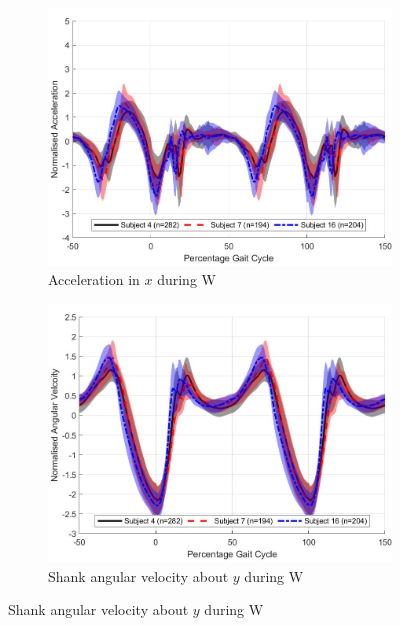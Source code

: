 \documentclass[sensors,article,submit,moreauthors,pdftex]{Definitions/mdpi}
\begin{document}
\begin{figure}[!htb]
     \centering
     \begin{subfigure}[b]{0.49\textwidth}
         \centering
         \includegraphics[width=\textwidth]{Figures/inter_subject_trends/accel_x_trend_Walking.jpg}
         \caption{Acceleration in $x$ during W}
         \label{subfig:x_accel_w}
     \end{subfigure}
     \hfill
     \begin{subfigure}[b]{0.49\textwidth}
         \centering
         \includegraphics[width=\textwidth]{Figures/inter_subject_trends/gyro_y_trend_Walking.jpg}
         \caption{Shank angular velocity about $y$ during W}
         \label{subfig:y_gyro_w}
     \end{subfigure}

\end{figure}
\end{document}
